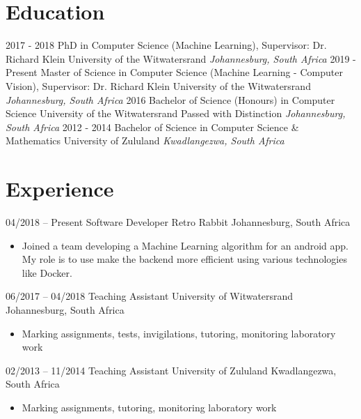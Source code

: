 \documentclass[letterpaper]{moderncv}        %
\begin{document}
\makecvtitle

%

\section{Education}
\cventry
{2017 - 2018}
{PhD in Computer Science (Machine Learning), Supervisor: Dr. Richard Klein}
{University of the Witwatersrand}
{}
{\textit{Johannesburg, South Africa}}
{}
\cventry
{2019 - Present}
{Master of Science in Computer Science (Machine Learning - Computer Vision), Supervisor: Dr. Richard Klein}
{University of the Witwatersrand}
{}
{\textit{Johannesburg, South Africa}}
{}
\cventry
{2016}
{Bachelor of Science (Honours) in Computer Science}
{University of the Witwatersrand}
{Passed with Distinction}
{\textit{Johannesburg, South Africa}}
{}
\cventry
{2012 - 2014}
{Bachelor of Science in Computer Science \& Mathematics}
{University of Zululand}
{}
{\textit{Kwadlangezwa, South Africa}}
{}
\section{Experience}
\cventry
{04/2018 -- Present}
{Software Developer}
{Retro Rabbit}
{Johannesburg, South Africa}
{}
{\begin{itemize}%
		\item Joined a team developing a Machine Learning algorithm for an android app. My role is to use make the backend more efficient using various technologies like Docker. 
	\end{itemize}}
\cventry
{06/2017 -- 04/2018}
{Teaching Assistant}
{University of Witwatersrand}
{Johannesburg, South Africa}
{}
{\begin{itemize}%
	\item Marking assignments, tests, invigilations, tutoring, monitoring laboratory work
	\end{itemize}}
\cventry
{02/2013 -- 11/2014}
{Teaching Assistant}
{University of Zululand}
{Kwadlangezwa, South Africa}
{}
{\begin{itemize}%
	\item Marking assignments, tutoring, monitoring laboratory work
	\end{itemize}}
\end{document}
